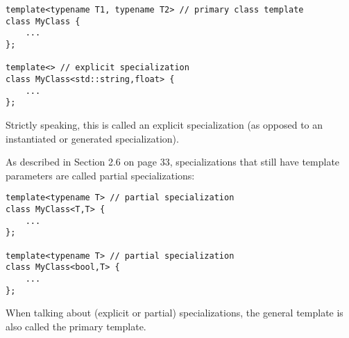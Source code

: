 \begin{lstlisting}[style=styleCXX]
template<typename T1, typename T2> // primary class template
class MyClass {
	...
};

template<> // explicit specialization
class MyClass<std::string,float> {
	...
};
\end{lstlisting}

Strictly speaking, this is called an explicit specialization (as opposed to an instantiated or generated specialization).

As described in Section 2.6 on page 33, specializations that still have template parameters are called partial specializations:

\begin{lstlisting}[style=styleCXX]
template<typename T> // partial specialization
class MyClass<T,T> {
	...
};

template<typename T> // partial specialization
class MyClass<bool,T> {
	...
};
\end{lstlisting}

When talking about (explicit or partial) specializations, the general template is also called the primary template.















